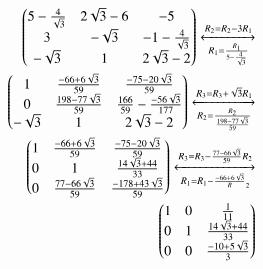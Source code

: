 \documentclass[journal,12pt,twocolumn]{IEEEtran}
\begin{document}
\begin{align}
 \begin{pmatrix}5-\frac{4}{\sqrt{3}}& 2\sqrt{3}-6 & -5\\ 3 & -\sqrt{3} & -1-\frac{4}{\sqrt{3}}\\  -\sqrt{3} & 1 & 2\sqrt{3}-2 \end{pmatrix} 
\xleftrightarrow[R_1=\frac{R_1}{5-\frac{4}{\sqrt{3}}}]{R_2=R_2-3R_1} \nonumber \\
 \begin{pmatrix}1& \frac{-66+6\sqrt{3}}{59} & \frac{-75-20\sqrt{3}}{59} \\ 0 &\frac{198-77\sqrt{3}}{59} & \frac{166}{59}-\frac{-56\sqrt{3}}{177}\\  -\sqrt{3} & 1 & 2\sqrt{3}-2 \end{pmatrix}  
 \xleftrightarrow[R_2=\frac{R_2}{\frac{198-77\sqrt{3}}{59}}]{R_3=R_3+\sqrt{3}R_1} \nonumber \\
 \begin{pmatrix}1& \frac{-66+6\sqrt{3}}{59} & \frac{-75-20\sqrt{3}}{59} \\
 0 &1 & \frac{14\sqrt{3}+44}{33} \\
 0 & \frac{77-66\sqrt{3}}{59} & \frac{-178+43\sqrt{3}}{59}\end{pmatrix}  \xleftrightarrow[R_1=R_1-\frac{-66+6\sqrt{3}}R_2]{R_3=R_3-\frac{77-66\sqrt{3}}{59}R_2} \nonumber \\
  \begin{pmatrix}1& 0 & \frac{1}{11} \\
 0 &1 & \frac{14\sqrt{3}+44}{33} \\
 0 & 0 & \frac{-10+5\sqrt{3}}{3}\end{pmatrix} 
\end{align}
\end{document}
